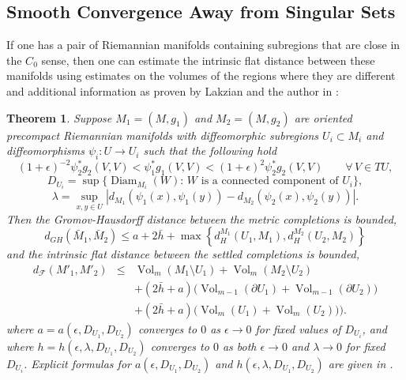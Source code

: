 \documentclass[12pt]{amsart}
\newtheorem{thm}{Theorem}[section]
\begin{document}
\subsection{Smooth Convergence Away from Singular Sets} \label{sect-smooth}

If one has a pair of Riemannian manifolds containing subregions that
are close in the $C_0$ sense, then one can estimate the intrinsic
flat distance between these manifolds using estimates on the
volumes of the regions where they are different and additional information
as proven by Lakzian and the author in \cite{Lakzian-Sormani}: 

\begin{thm} \label{thm-subdiffeo}
Suppose $M_1=(M,g_1)$ and $M_2=(M,g_2)$ are oriented
precompact Riemannian manifolds
with diffeomorphic subregions $U_i \subset M_i$ and
diffeomorphisms $\psi_i: U \to U_i$ such that the following hold
\begin{equation} \label{thm-subdiffeo-1}
(1+\epsilon)^{-2} \psi_2^*g_2(V,V)<\psi_1^*g_1(V,V)
< (1+\epsilon)^2 \psi_2^*g_2(V,V) \qquad \forall \, V \in TU,
\end{equation}
\begin{equation} \label{DU}
D_{U_i}= \sup\{{\operatorname{Diam}}_{M_i}(W): \, W\textrm{ is a connected component of } U_i\},
\end{equation}
\begin{equation} \label{lambda}
\lambda=\sup_{x,y \in U}
|d_{M_1}(\psi_1(x),\psi_1(y))-d_{M_2}(\psi_2(x),\psi_2(y))|.
\end{equation}
Then the Gromov-Hausdorff distance between the metric
completions is bounded,
\begin{equation} \label{thm-subdiffeo-6}
d_{GH}(\bar{M}_1, \bar{M}_2 ) \le a + 2\bar{h} +
\max\left\{ d^{M_1}_H(U_1, M_1), d^{M_2}_H(U_2, M_2)\right\}
\end{equation}
and the intrinsic flat distance between the
settled completions is bounded,
\begin{eqnarray}
d_{\mathcal{F}}(M'_1, M'_2) &\le&
{\operatorname{Vol}}_m(M_1\setminus U_1)+{\operatorname{Vol}}_m(M_2\setminus U_2) \label{sda1}\\
&&+
\left(2\bar{h} + a\right) \Big(
{\operatorname{Vol}}_{m-1}(\partial U_{1})+{\operatorname{Vol}}_{m-1}(\partial U_{2})\Big)\label{sda2}\\
&&+\left(2\bar{h} + a\right) \Big(
{\operatorname{Vol}}_m(U_{1})+{\operatorname{Vol}}_m(U_2))\Big) \label{sdb}.
\end {eqnarray}
where
$
a=a(\epsilon, D_{U_1}, D_{U_2}) 
$
converges to $0$ as $\epsilon \to 0$ for fixed values of $D_{U_i}$,
and where
$
h = h(\epsilon, \lambda, D_{U_1}, D_{U_2})
$
converges to $0$ as both $\epsilon \to 0$ and $\lambda\to 0$
for fixed $D_{U_i}$.  Explicit formulas for $a(\epsilon, D_{U_1}, D_{U_2})$
and $h(\epsilon, \lambda, D_{U_1}, D_{U_2})$ are given in \cite{Lakzian-Sormani}.
\end{thm}
\end{document}
